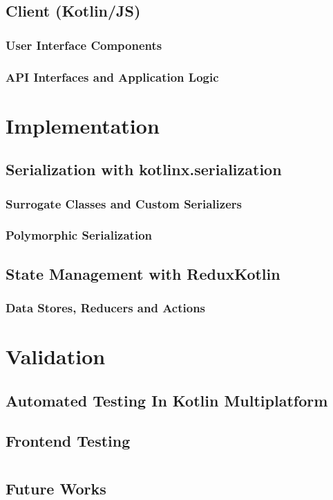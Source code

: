 \documentclass[12pt,a4paper,openright,twoside]{book}
\begin{document}
\section{Client (Kotlin/JS)}
\label{sec:client-kotlin-js}
\subsection{User Interface Components}
\label{ssec:user-interface-components}
\subsection{API Interfaces and Application Logic}
\label{ssec:api-interfaces-and-application-logic}
\chapter{Implementation}
\label{chap:implementation}
\section{Serialization with kotlinx.serialization}
\label{sec:serialization-with-kotlinx-serialization}
\subsection{Surrogate Classes and Custom Serializers}
\label{ssec:surrogate-classes-and-custom-serializers}
\subsection{Polymorphic Serialization}
\label{ssec:polymorphic-serialization}
\section{State Management with ReduxKotlin}
\label{sec:state-management-with-reduxkotlin}
\subsection{Data Stores, Reducers and Actions}
\label{ssec:data-stores-reducers-and-actions}
\chapter{Validation}
\label{chap:validation}
\section{Automated Testing In Kotlin Multiplatform}
\label{sec:automated-testing-in-kotlin-multiplatform}
\section{Frontend Testing}
\label{sec:frontend-testing}
\chapter{\conclusionsname}
\label{chap:conclusions}
\section{Future Works}
\label{sec:future-works}
\nocite{*}


\end{document}

